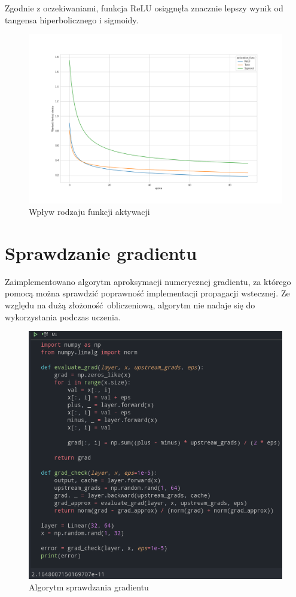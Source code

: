 \documentclass{article}
\begin{document}
Zgodnie z oczekiwaniami, funkcja ReLU osiągnęła znacznie lepszy wynik od tangensa hiperbolicznego i sigmoidy.
\begin{figure}[H]
  \centering
  \includegraphics[width=\textwidth]{images/act_func_comp.png}
  \caption{Wpływ rodzaju funkcji aktywacji}
\end{figure}

\pagebreak
\section{Sprawdzanie gradientu}
Zaimplementowano algorytm aproksymacji numerycznej gradientu, za którego pomocą można sprawdzić poprawność implementacji propagacji wstecznej. 
Ze względu na dużą złożoność obliczeniową, algorytm nie nadaje się do wykorzystania podczas uczenia.
\begin{figure}[H]
  \centering
  \includegraphics[width=\textwidth]{images/grads.png}
  \caption{Algorytm sprawdzania gradientu}
\end{figure}
\end{document}
